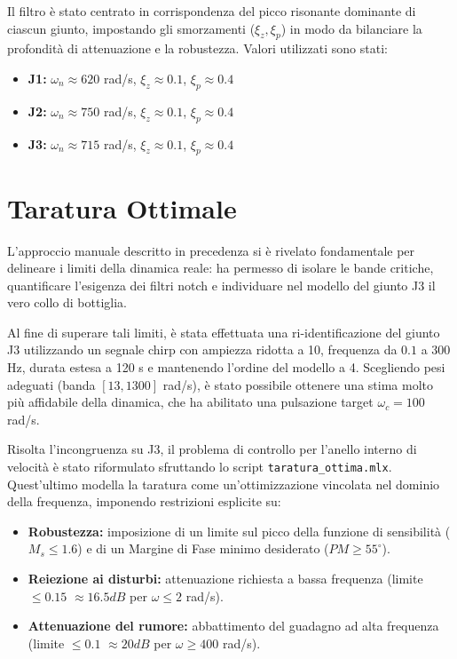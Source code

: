 \documentclass{article}
\begin{document}
Il filtro è stato centrato in corrispondenza del picco risonante dominante di ciascun giunto, impostando gli smorzamenti ($\xi_z, \xi_p$)
in modo da bilanciare la profondità di attenuazione e la robustezza. 
Valori utilizzati sono stati:
\begin{itemize}
    \item \textbf{J1:} $\omega_n \approx 620$ rad/s, $\xi_z \approx 0.1$, $\xi_p \approx 0.4$
    \item \textbf{J2:} $\omega_n \approx 750$ rad/s, $\xi_z \approx 0.1$, $\xi_p \approx 0.4$
    \item \textbf{J3:} $\omega_n \approx 715$ rad/s, $\xi_z \approx 0.1$, $\xi_p \approx 0.4$
\end{itemize}

\section{Taratura Ottimale}

L'approccio manuale descritto in precedenza si è rivelato fondamentale per delineare i limiti della dinamica reale: ha permesso di isolare le bande critiche, 
quantificare l'esigenza dei filtri notch e individuare nel modello del giunto J3 il vero collo di bottiglia. 

Al fine di superare tali limiti, è stata effettuata una ri-identificazione del giunto J3 utilizzando un segnale chirp con ampiezza ridotta a 10, 
frequenza da $0.1$ a $300$ Hz, durata estesa a 120 s e mantenendo l'ordine del modello a 4. Scegliendo pesi adeguati (banda $[13, 1300]$ rad/s),
 è stato possibile ottenere una stima molto più affidabile della dinamica, che ha abilitato una pulsazione target $\omega_c = 100$ rad/s.

Risolta l'incongruenza su J3, il problema di controllo per l'anello interno di velocità è stato riformulato sfruttando lo script \texttt{taratura\_ottima.mlx}. 
Quest'ultimo modella la taratura come un'ottimizzazione vincolata nel dominio della frequenza, imponendo restrizioni esplicite su:
\begin{itemize}
    \item \textbf{Robustezza:} imposizione di un limite sul picco della funzione di sensibilità ($M_s \le 1.6$) e di un Margine di Fase minimo desiderato ($PM \ge 55^\circ$).
    \item \textbf{Reiezione ai disturbi:} attenuazione richiesta a bassa frequenza (limite $\le 0.15$ $\approx 16.5 dB$ per $\omega \le 2$ rad/s).
    \item \textbf{Attenuazione del rumore:} abbattimento del guadagno ad alta frequenza (limite $\le 0.1$ $\approx 20 dB$ per $\omega \ge 400$ rad/s).
\end{itemize}
\end{document}
